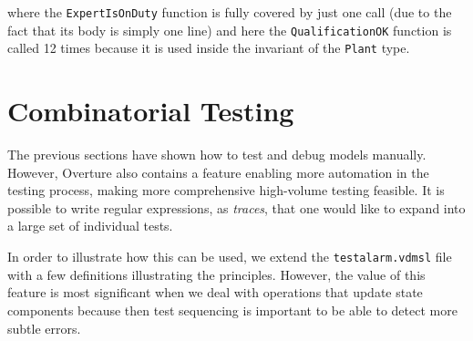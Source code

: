{\noindent where the \texttt{ExpertIsOnDuty} function is fully covered
by just one call (due to the fact that its body is simply one line)
and here the \texttt{QualificationOK} function is called 12 times
because it is used inside the invariant of the \texttt{Plant} type.



\section{Combinatorial Testing}\label{sec:CT}

The previous sections have shown how to test and debug models
manually. However, Overture also contains a feature enabling more
automation in the testing process, making more comprehensive
high-volume testing feasible. It is possible to write regular
expressions, as \emph{traces}, that one would like to expand into a
large set of individual tests.

In order to illustrate how this can be used, we extend the
\texttt{testalarm.vdmsl} file with a few definitions illustrating the
principles. However, the value of this feature is most significant
when we deal with operations that update state components because then
test sequencing is important to be able to detect more subtle errors.

}
